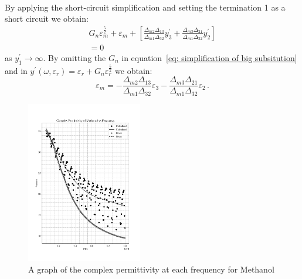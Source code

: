 \documentclass[12pt, a4paper]{article}
\begin{document}
\begin{multicols*}{2}
\begin{multline}
\end{multline}
By applying the short-circuit simplification and setting the termination 1 as a short circuit we obtain:
\begin{multline}
    G_n \varepsilon_m^{\frac{5}{2}} + \varepsilon_m + \left[\frac{\Delta_{m2}\Delta_{13}}{\Delta_{m1}\Delta_{32}} y^{\prime}_3 + \frac{\Delta_{m3}\Delta_{21}}{\Delta_{m1}\Delta_{32}} y^{\prime}_2\right] \\ = 0 \, \label{eq: simplification of big subsitution}
\end{multline}
as \(y^{\prime}_1 \rightarrow \infty\). By omitting the \(G_n\) in equation~\ref{eq: simplification of big subsitution} and in \(y^{\prime}(\omega, \varepsilon_r) = \varepsilon_r + G_n \varepsilon_r^{\frac{5}{2}}\) we obtain:
\begin{equation}
    \varepsilon_m = - \frac{\Delta_{m2}\Delta_{13}}{\Delta_{m1}\Delta_{32}} \varepsilon_3 - \frac{\Delta_{m3}\Delta_{21}}{\Delta_{m1}\Delta_{32}} \varepsilon_2 \,.
\end{equation}

\begin{figure}[H]
    \centering
    \includegraphics[width = 0.45\textwidth]{Plot1.png}\caption{A graph of the complex permittivity at each frequency for Methanol}\label{fig: Methanol Graph}
\end{figure}


\end{multicols*}
\end{document}
